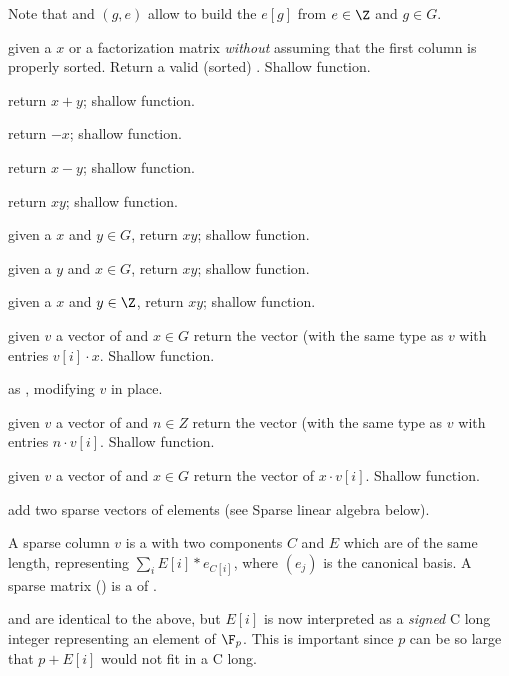 Note that  and $(g,e)$ allow to build
the  $e[g]$ from $e\in \Z$ and $g\in G$.

 given a  $x$ or a factorization
matrix \emph{without} assuming that the first column is properly sorted.
Return a valid (sorted) . Shallow function.

 return $x+y$; shallow function.

 return $-x$; shallow function.

 return $x-y$; shallow function.

 return $xy$; shallow function.

 given a  $x$ and $y\in G$,
 return $xy$; shallow function.

 given a  $y$ and $x\in G$,
 return $xy$; shallow function.

 given a  $x$ and $y\in \Z$,
 return $xy$; shallow function.

 given $v$ a vector of  and $x\in
G$ return the vector (with the same type as $v$ with entries $v[i]\cdot x$.
Shallow function.

 as , modifying
$v$ in place.

 given $v$ a vector of  and $n\in
Z$ return the vector (with the same type as $v$ with entries $n \cdot v[i]$.
Shallow function.

 given $v$ a vector of  and $x\in
G$ return the vector of $x \cdot v[i]$. Shallow function.

 add two sparse vectors of
 elements (see Sparse linear algebra below).


A sparse column  $v$ is a  with two components $C$ and $E$
which are  of the same length, representing $\sum_i
E[i]*e_{C[i]}$, where $(e_j)$ is the canonical basis. A sparse matrix
() is a  of .

 and  are identical to the above, but $E[i]$ is now
interpreted as a \emph{signed} C long integer representing an element of
$\F_p$. This is important since $p$ can be so large that $p+E[i]$ would not
fit in a C long.

